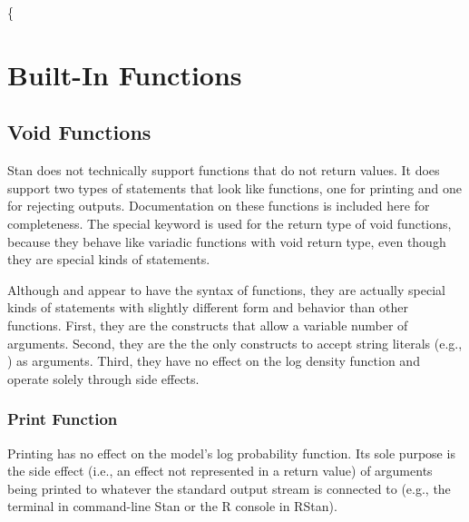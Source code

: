 \{\part{Built-In Functions}

\chapter{Void Functions}

Stan does not technically support functions that do not return values. It does support two types of statements that look like functions, one for printing and one for rejecting outputs.  Documentation on these functions is included here for completeness.  The special keyword  is used for the return type of void functions, because they behave like variadic functions with void return type, even though they are special kinds of statements.

Although  and  appear to have the syntax of functions, they are actually special kinds of statements with slightly different form and behavior than other functions.  First, they are the constructs that allow a variable number of arguments.  Second, they are the the only constructs to accept string literals (e.g., ) as arguments.  Third, they have no effect on the log density function and operate solely through side effects.

\section{Print Function}

Printing has no effect on the model's log probability function.  Its sole purpose is the side effect (i.e., an effect not represented in a return value) of arguments being printed to whatever the standard output stream is connected to (e.g., the terminal in command-line Stan or the R console in RStan).

\begin{description}    \end{description}

